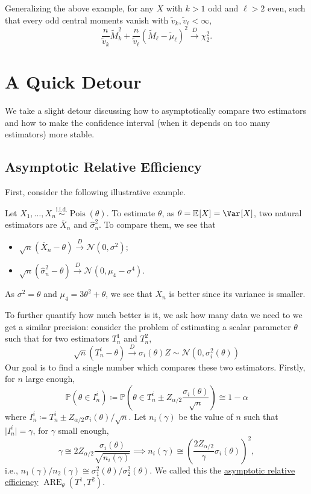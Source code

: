 Generalizing the above example, for any \(X\) with \(k > 1\) odd and \(\ell > 2\) even, such that every odd central moments vanish with \(\widetilde{v} _k , \widetilde{v} _\ell < \infty \),
\[
	\frac{n}{\widetilde{v} _k} \widetilde{M} _k^2 + \frac{n}{\widetilde{v} _\ell }(\widetilde{M} _\ell - \widetilde{\mu} _\ell )^2 \overset{D}{\to} \chi _2^2 .
\]

\section{A Quick Detour}
We take a slight detour discussing how to asymptotically compare two estimators and how to make the confidence interval (when it depends on too many estimators) more stable.

\subsection{Asymptotic Relative Efficiency}
First, consider the following illustrative example.

\begin{eg}\label{eg:ARE}
	Let \(X_1, \dots , X_n \overset{\text{i.i.d.} }{\sim } \operatorname{Pois}(\theta ) \). To estimate \(\theta \), as \(\theta = \mathbb{E}_{}[X] = \Var_{}[X] \), two natural estimators are \(\overline{X} _n\) and \(\hat{\sigma} _n^2\). To compare them, we see that
	\begin{itemize}
		\item \(\sqrt{n} (\overline{X} _n - \theta ) \overset{D}{\to} \mathcal{N} (0, \sigma ^2)\);
		\item \(\sqrt{n} (\hat{\sigma} _n^2 - \theta ) \overset{D}{\to} \mathcal{N} (0, \mu _4 - \sigma ^4)\).
	\end{itemize}
	As \(\sigma ^2 = \theta \) and \(\mu _4 = 3 \theta ^2 + \theta \), we see that \(\overline{X} _n\) is better since its variance is smaller.
\end{eg}

To further quantify how much better is it, we ask how many data we need to we get a similar precision: consider the problem of estimating a scalar parameter \(\theta \) such that for two estimators \(T_n^1\) and \(T_n^2\),
\[
	\sqrt{n} (T_n^i - \theta )
	\overset{D}{\to} \sigma _i (\theta ) Z \sim \mathcal{N} (0, \sigma _i^2(\theta ))
\]
Our goal is to find a single number which compares these two estimators. Firstly, for \(n\) large enough,
\[
	\mathbb{P} (\theta \in I_n^{i})
	\coloneqq \mathbb{P} \left( \theta \in T_n^i \pm Z_{\alpha / 2} \frac{\sigma _i(\theta )}{\sqrt{n} } \right)
	\cong 1 - \alpha
\]
where \(I_n^{i} \coloneqq T_n^i \pm Z_{\alpha / 2} \sigma _i(\theta ) / \sqrt{n} \). Let \(n_i(\gamma )\) be the value of \(n\) such that \(\vert I_n^{i} \vert = \gamma \), for \(\gamma \) small enough,
\[
	\gamma \cong 2 Z_{\alpha / 2} \frac{\sigma _i(\theta )}{\sqrt{n_i (\gamma )} }
	\implies n_i(\gamma ) \cong \left( \frac{2 Z_{\alpha / 2}}{\gamma } \sigma _i(\theta ) \right)^2 ,
\]
i.e., \(n_1(\gamma ) / n_2(\gamma ) \cong \sigma _1^2(\theta ) / \sigma _2^2(\theta )\). We called this the \hyperref[def:asymptotic-relative-efficiency-estimator]{asymptotic relative efficiency} \(\operatorname{ARE}_\theta (T^1, T^2) \).

